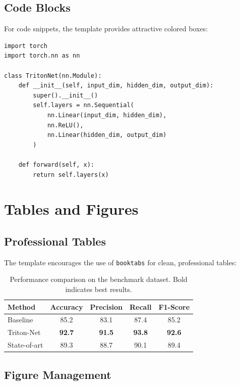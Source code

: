 \documentclass{triton}
\begin{document}
\subsection{Code Blocks}

For code snippets, the template provides attractive colored boxes:

\begin{tcolorbox}[colback=ucsdlightblue!10,colframe=ucsdblue,title=PyTorch Implementation Example]
\begin{verbatim}
import torch
import torch.nn as nn

class TritonNet(nn.Module):
    def __init__(self, input_dim, hidden_dim, output_dim):
        super().__init__()
        self.layers = nn.Sequential(
            nn.Linear(input_dim, hidden_dim),
            nn.ReLU(),
            nn.Linear(hidden_dim, output_dim)
        )
    
    def forward(self, x):
        return self.layers(x)
\end{verbatim}
\end{tcolorbox}

\section{Tables and Figures}

\subsection{Professional Tables}

The template encourages the use of \texttt{booktabs} for clean, professional tables:

\begin{table}[h]
\centering
\begin{tabular}{@{}lcccc@{}}
\toprule
\textbf{Method} & \textbf{Accuracy} & \textbf{Precision} & \textbf{Recall} & \textbf{F1-Score} \\
\midrule
Baseline & 85.2 & 83.1 & 87.4 & 85.2 \\
Triton-Net & \textbf{92.7} & \textbf{91.5} & \textbf{93.8} & \textbf{92.6} \\
State-of-art & 89.3 & 88.7 & 90.1 & 89.4 \\
\bottomrule
\end{tabular}
\caption{Performance comparison on the benchmark dataset. Bold indicates best results.}
\label{tab:results}
\end{table}

\subsection{Figure Management}
\end{document}
